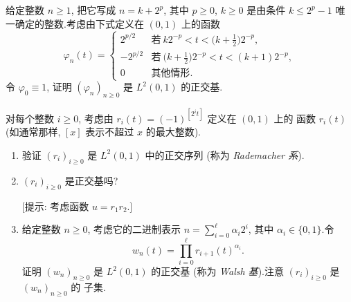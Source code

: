 \begin{exercise}[Haar 基.]
\label{exer:5.31}
给定整数 $n\ge1$, 把它写成 $n=k+2^p$, 其中 $p\ge0$, $k\ge0$ 是由条件
$k\le2^p-1$ 唯一确定的整数.考虑由下式定义在 $(0,1)$ 上的函数
\begin{equation*}
\varphi_n(t)=\begin{cases}
2^{p/2} & \text{若}\ k2^{-p}<t<\bigl(k+\frac12\bigr)2^{-p},\\
-2^{p/2} & \text{若}\ \bigl(k+\frac12\bigr)2^{-p}<t<(k+1)2^{-p},\\
0 & \text{其他情形}.
\end{cases}
\end{equation*}
令 $\varphi_0\equiv1$, 证明 $(\varphi_n)_{n\ge0}$ 是 $L^2(0,1)$ 的正交基.
\end{exercise}

\begin{exercise}
\label{exer:5.32}
对每个整数 $i\ge0$, 考虑由 $r_i(t)=(-1)^{[2^it]}$ 定义在 $(0,1)$ 上的
函数 $r_i(t)$ (如通常那样, $[x]$ 表示不超过 $x$ 的最大整数).
\begin{enumerate}[label=\arabic*., leftmargin=2.2em, itemsep=0.3em]
	\item 验证 $(r_i)_{i\ge0}$ 是 $L^2(0,1)$ 中的正交序列 (称为
	      \emph{Rademacher 系}).
	\item $(r_i)_{i\ge0}$ 是正交基吗?

	      [提示: 考虑函数 $u=r_1r_2$.]
	\item 给定整数 $n\ge0$, 考虑它的二进制表示
	      $n=\sum_{i=0}^\ell\alpha_i2^i$, 其中 $\alpha_i\in\{0,1\}$.令
	      \begin{equation*}
	      w_n(t)=\prod_{i=0}^\ell r_{i+1}(t)^{\alpha_i}.
	      \end{equation*}
	      证明 $(w_n)_{n\ge0}$ 是 $L^2(0,1)$ 的正交基 (称为
	      \emph{Walsh 基}).注意 $(r_i)_{i\ge0}$ 是 $(w_n)_{n\ge0}$ 的
	      子集.
\end{enumerate}
\end{exercise}
